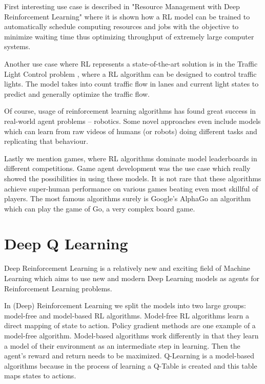\documentclass[b5paper]{book}
\let\cite\parencite
\begin{document}
First interesting use case is described in "Resource Management with Deep Reinforcement Learning" \cite{mao2016resource} where it is shown how a RL model can be trained to automatically schedule computing resources and jobs with the objective to minimize waiting time thus optimizing throughput of extremely large computer systems.

Another use case where RL represents a state-of-the-art solution is in the Traffic Light Control problem \cite{wiering2000multi}, where a RL algorithm can be designed to control traffic lights. The model takes into count traffic flow in lanes and current light states to predict and generally optimize the traffic flow.

Of course, usage of reinforcement learning algorithms has found great success in real-world agent problems -- robotics. Some novel approaches even include models which can learn from raw videos of humans (or robots) doing different tasks and replicating that behaviour. \cite{mnih2015human}

Lastly we mention games, where RL algorithms dominate model leaderboards in different competitions. \cite{mnih2013playing} \cite{silver2016mastering} Game agent development was the use case which really showed the possibilities in using these models. It is not rare that these algorithms achieve super-human performance on various games beating even most skillful of players. The most famous algorithms surely is Google's AlphaGo an algorithm which can play the game of Go, a very complex board game.

\section{Deep Q Learning}



Deep Reinforcement Learning is a relatively new and exciting field of Machine Learning which aims to use new and modern Deep Learning models as agents for Reinforcement Learning problems.

In (Deep) Reinforcement Learning we split the models into two large groups: model-free and model-based RL algorithms. Model-free RL algorithms learn a direct mapping of state to action. Policy gradient methods are one example of a model-free algorithm. Model-based algorithms work differently in that they learn a model of their environment as an intermediate step in learning. Then the agent's reward and return needs to be maximized. Q-Learning is a model-based algorithms because in the process of learning a Q-Table is created and this table maps states to actions.
\end{document}
